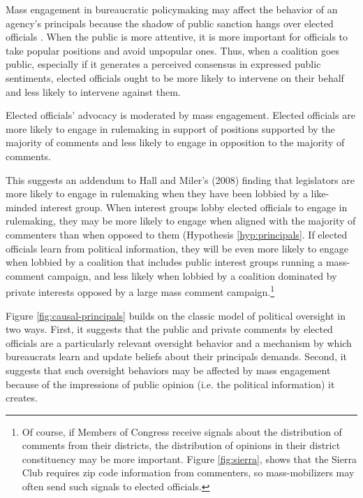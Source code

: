 Mass engagement in bureaucratic policymaking may affect the behavior of an agency's principals because the shadow of public sanction hangs over elected officials \citep{Arnold1979, Mayhew2000}. When the public is more attentive, it is more important for officials to take popular positions and avoid unpopular ones.
Thus, when a coalition goes public, especially if it generates a perceived consensus in expressed public sentiments, elected officials ought to be more likely to intervene on their behalf and less likely to intervene against them.  

\begin{hyp} \label{hyp:principals}
Elected officials' advocacy is moderated by mass engagement. Elected officials are more likely to engage in rulemaking in support of positions supported by the majority of comments and less likely to engage in opposition to the majority of comments.
\end{hyp}

This suggests an addendum to Hall and Miler's (2008) finding that legislators are more likely to engage in rulemaking when they have been lobbied by a like-minded interest group.
When interest groups lobby elected officials to engage in rulemaking, they may be more likely to engage when aligned with the majority of commenters than when opposed to them (Hypothesis \ref{hyp:principals}.
If elected officials learn from political information, they will be even more likely to engage when lobbied by a coalition that includes public interest groups running a mass-comment campaign, and less likely when lobbied by a coalition dominated by private interests opposed by a large mass comment campaign.\footnote{Of course, if Members of Congress receive signals about the distribution of comments from their districts, the distribution of opinions in their district constituency may be more important. Figure \ref{fig:sierra}, shows that the Sierra Club requires zip code information from commenters, so mass-mobilizers may often send such signals to elected officials.}



Figure \ref{fig:causal-principals} builds on the classic model of political oversight in two ways. First, it suggests that the public and private comments by elected officials are a particularly relevant oversight behavior and a mechanism by which bureaucrats learn and update beliefs about their principals demands. Second, it suggests that such oversight behaviors may be affected by mass engagement because of the impressions of public opinion (i.e. the political information) it creates.